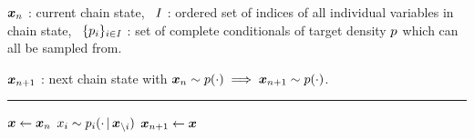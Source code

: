 \begin{algorithmic}
\small
    \Require
    $\boldsymbol{x}_n$ : current chain state,~
    $\mathit{I}$ : ordered set of indices of all individual variables in chain state,~
    $\lbrace p_{i} \rbrace_{i\in\mathit{I}}$ : set of complete conditionals of target density $p$ which can all be sampled from.
    \Ensure\raggedright
    $\boldsymbol{x}_{n+1}$ : next chain state with $\boldsymbol{x}_n \sim p(\cdot) \implies \boldsymbol{x}_{n+1} \sim p(\cdot)$.
\end{algorithmic}
\hrule
\small
\begin{algorithmic}[1]
  \State $\boldsymbol{x} \gets \boldsymbol{x}_n$
    \State $x_i \sim p_{i}(\cdot \operatorname{|} \boldsymbol{x}_{\backslash i})$ 
  \EndFor
  \State $\boldsymbol{x}_{n+1} \gets \boldsymbol{x}$
\end{algorithmic}
